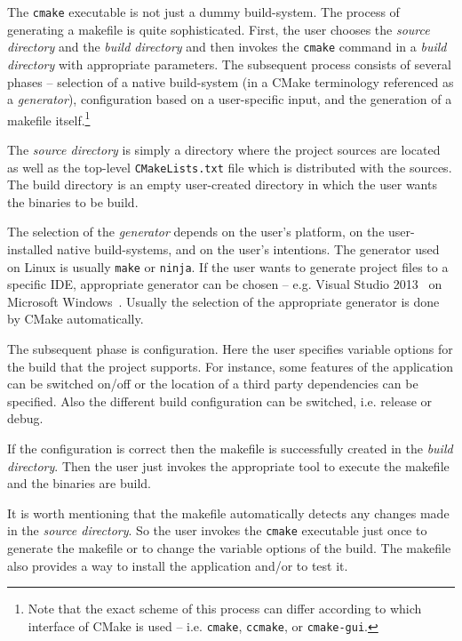 \documentclass[12pt,twoside]{fithesis2}
\begin{document}
The \texttt{cmake} executable is not just a dummy build-system. The process of generating a makefile is quite sophisticated. First, the user chooses the \emph{source directory} and the \emph{build directory} and then invokes the \texttt{cmake} command in a \emph{build directory} with appropriate parameters. The subsequent process consists of several phases -- selection of a native build-system (in a CMake terminology referenced as a \emph{generator}), configuration based on a user-specific input, and the generation of a makefile itself.\footnote{Note that the exact scheme of this process can differ according to which interface of CMake is used -- i.e. \texttt{cmake}, \texttt{ccmake}, or \texttt{cmake-gui}.}~\cite{cmake_docs}

The \emph{source directory} is simply a directory where the project sources are located as well as the top-level \texttt{CMakeLists.txt} file which is distributed with the sources. The build directory is an empty user-created directory in which the user wants the binaries to be build.

The selection of the \emph{generator} depends on the user's platform, on the user-installed native build-systems, and on the user's intentions. The generator used on Linux is usually \texttt{make} or \texttt{ninja}. If the user wants to generate project files to a specific IDE, appropriate generator can be chosen -- e.g. Visual Studio 2013~\cite{msvc} on Microsoft Windows~\cite{win}. Usually the selection of the appropriate generator is done by CMake automatically.

The subsequent phase is configuration. Here the user specifies variable options for the build that the project supports. For instance, some features of the application can be switched on/off or the location of a third party dependencies can be specified. Also the different build configuration can be switched, i.e. release or debug.

If the configuration is correct then the makefile is successfully created in the \emph{build directory}. Then the user just invokes the appropriate tool to execute the makefile and the binaries are build.

It is worth mentioning that the makefile automatically detects any changes made in the \emph{source directory}. So the user invokes the \texttt{cmake} executable just once to generate the makefile or to change the variable options of the build. The makefile also provides a way to install the application and/or to test it.
\end{document}
